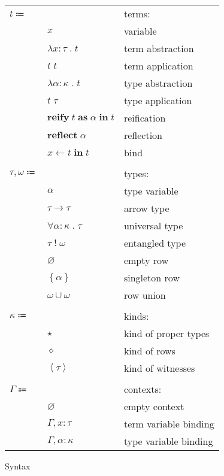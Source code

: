 \documentclass[12pt]{article}
\newcommand\anno[2]{#1 : #2}
\newcommand\kAnno[2]{#1 : #2}
\newcommand\term{t}
\newcommand\eVar{x}
\newcommand\eAbs[3]{\lambda \anno{#1}{#2} \; . \; #3}
\newcommand\eApp[2]{#1 \; #2}
\newcommand\eTAbs[3]{\lambda \kAnno{#1}{#2} \; . \; #3}
\newcommand\eTApp[2]{#1 \; #2}
\newcommand\eReify[3]{\textbf{reify} \; #1 \; \textbf{as} \; #2 \; \textbf{in} \; #3}
\newcommand\eReflect[1]{\textbf{reflect} \; #1}
\newcommand\eBind[3]{#1 \leftarrow #2 \; \textbf{in} \; #3}
\newcommand\type{\tau}
\newcommand\tVar{\alpha}
\newcommand\tArrow[2]{#1 \rightarrow #2}
\newcommand\tForAll[3]{\forall \kAnno{#1}{#2} \; . \; #3}
\newcommand\tEntangled[2]{#1 \; ! \; #2}
\newcommand\row{\omega}
\newcommand\tEmpty{\varnothing}
\newcommand\tSingleton[1]{\left\{ #1 \right\}}
\newcommand\tUnion[2]{#1 \cup #2}
\newcommand\kind{\kappa}
\newcommand\kType{\star}
\newcommand\kRow{\diamond}
\newcommand\kWitness[1]{\left\langle #1 \right\rangle}
\newcommand\context{\Gamma}
\newcommand\cEmpty{\varnothing}
\newcommand\cEExtend[3]{#1, \anno{#2}{#3}}
\newcommand\cTExtend[3]{#1, \kAnno{#2}{#3}}
\begin{document}
      \begin{figure}[H]
        \begin{mdframed}[backgroundcolor=none]
          \begin{center}
            \begin{tabular}{l l l}
              $\term \Coloneqq$ & & terms: \\
              & $\eVar$ & variable \\
              & $\eAbs{\eVar}{\type}{\term}$ & term abstraction \\
              & $\eApp{\term}{\term}$ & term application \\
              & $\eTAbs{\tVar}{\kind}{\term}$ & type abstraction \\
              & $\eTApp{\term}{\type}$ & type application \\
              & $\eReify{\term}{\tVar}{\term}$ & reification \\
              & $\eReflect{\tVar}$ & reflection \\
              & $\eBind{\eVar}{\term}{\term}$ & bind \\
              \\
              $\type, \row \Coloneqq$ & & types: \\
              & $\tVar$ & type variable \\
              & $\tArrow{\type}{\type}$ & arrow type \\
              & $\tForAll{\tVar}{\kind}{\type}$ & universal type \\
              & $\tEntangled{\type}{\row}$ & entangled type \\
              & $\tEmpty$ & empty row \\
              & $\tSingleton{\tVar}$ & singleton row \\
              & $\tUnion{\row}{\row}$ & row union \\
              \\
              $\kind \Coloneqq$ & & kinds: \\
              & $\kType$ & kind of proper types \\
              & $\kRow$ & kind of rows \\
              & $\kWitness{\type}$ & kind of witnesses \\
              \\
              $\context \Coloneqq$ & & contexts: \\
              & $\cEmpty$ & empty context \\
              & $\cEExtend{\context}{\eVar}{\type}$ & term variable binding \\
              & $\cTExtend{\context}{\tVar}{\kind}$ & type variable binding \\
            \end{tabular}
          \end{center}

          \caption{Syntax}\label{fig:syntax}
        \end{mdframed}
      \end{figure}
\end{document}

